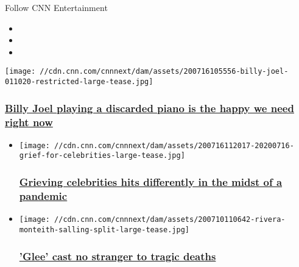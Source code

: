 Follow CNN Entertainment

\begin{itemize}
\item
\item
\item
\end{itemize}

\href{/2020/07/16/entertainment/billy-joel-piano-trnd/index.html}{}

\texttt{[image: //cdn.cnn.com/cnnnext/dam/assets/200716105556-billy-joel-011020-restricted-large-tease.jpg]}

\hypertarget{billy-joel-playing-a-discarded-piano-is-the-happy-we-need-right-now-}{%
\subsubsection{\texorpdfstring{\href{/2020/07/16/entertainment/billy-joel-piano-trnd/index.html}{Billy
Joel playing a discarded piano is the happy we need right now
}}{Billy Joel playing a discarded piano is the happy we need right now }}\label{billy-joel-playing-a-discarded-piano-is-the-happy-we-need-right-now-}}

\begin{itemize}
\item
  \href{/2020/07/16/entertainment/entertainment-newsletter/index.html}{}

  \texttt{[image: //cdn.cnn.com/cnnnext/dam/assets/200716112017-20200716-grief-for-celebrities-large-tease.jpg]}

  \hypertarget{grieving-celebrities-hits-differently-in-the-midst-of-a-pandemic-}{%
  \subsubsection{\texorpdfstring{\href{/2020/07/16/entertainment/entertainment-newsletter/index.html}{Grieving
  celebrities hits differently in the midst of a pandemic
  }}{Grieving celebrities hits differently in the midst of a pandemic }}\label{grieving-celebrities-hits-differently-in-the-midst-of-a-pandemic-}}
\item
  \href{/2020/07/13/entertainment/glee-cast-deaths/index.html}{}

  \texttt{[image: //cdn.cnn.com/cnnnext/dam/assets/200710110642-rivera-monteith-salling-split-large-tease.jpg]}

  \hypertarget{glee-cast-no-stranger-to-tragic-deaths-}{%
  \subsubsection{\texorpdfstring{\href{/2020/07/13/entertainment/glee-cast-deaths/index.html}{'Glee'
  cast no stranger to tragic deaths
  }}{'Glee' cast no stranger to tragic deaths }}\label{glee-cast-no-stranger-to-tragic-deaths-}}
\end{itemize}

